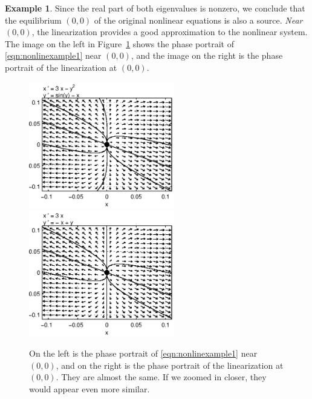 \documentclass[reqno]{immbook}
\numberwithin{equation}{chapter}
\numberwithin{question}{section}
\numberwithin{theorem}{chapter}
\numberwithin{figure}{chapter}
\theoremstyle{definition}
\newtheorem{example}{Example}[section]
\begin{document}
\begin{example}
Since the real part of both eigenvalues is nonzero,
we conclude that the equilibrium $(0,0)$ of the original
nonlinear equations is also a source.
\emph{Near $(0,0)$}, the linearization provides a
good approximation to the nonlinear system.
The image on the left in Figure~\ref{fig:nonlinexample1compare}
shows the phase portrait of \eqref{eqn:nonlinexample1}
near $(0,0)$, and the image on the right
is the phase portrait of the linearization at $(0,0)$.
\begin{figure}
\centerline{%
\includegraphics[width=2.5in]{pplane_plots/NonlinExample1detail.ps}
\includegraphics[width=2.5in]{pplane_plots/NonlinExample1lin.ps}
}
\caption{On the left is the phase portrait of
\eqref{eqn:nonlinexample1} near $(0,0)$, and on the
right is the phase portrait of the linearization
at $(0,0)$.  They are almost the same.  If we zoomed
in closer, they would appear even more similar.}
\label{fig:nonlinexample1compare}
\end{figure}
\end{example}
%
%
\end{document}
